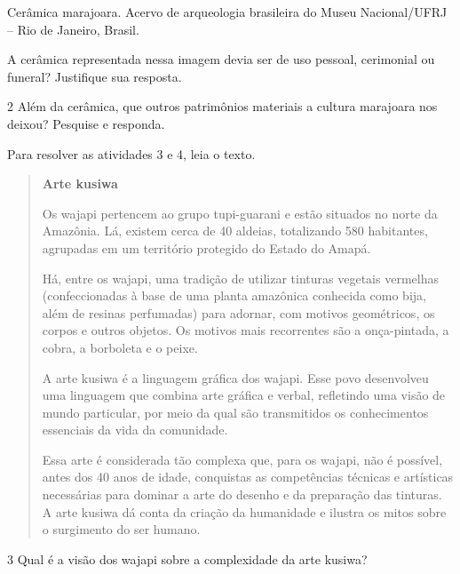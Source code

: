 Cerâmica marajoara. Acervo de arqueologia brasileira do Museu
Nacional/UFRJ -- Rio de Janeiro, Brasil.

A cerâmica representada nessa imagem devia ser de uso pessoal, cerimonial ou funeral? Justifique sua resposta.



\num{2}  Além da cerâmica, que outros patrimônios materiais a cultura marajoara nos deixou? Pesquise e responda.



Para resolver as atividades 3 e 4, leia o texto.

\begin{quote}
\textbf{Arte kusiwa}

Os wajapi pertencem ao grupo tupi-guarani e estão situados no norte da
Amazônia. Lá, existem cerca de 40 aldeias, totalizando 580 habitantes,
agrupadas em um território protegido do Estado do Amapá.

Há, entre os wajapi, uma tradição de utilizar tinturas vegetais vermelhas
(confeccionadas à base de uma planta amazônica conhecida como bija, além
de resinas perfumadas) para adornar, com motivos geométricos, os corpos e
outros objetos. Os motivos mais recorrentes são a onça-pintada, a cobra, a
borboleta e o peixe.

A arte kusiwa é a linguagem gráfica dos wajapi. Esse povo
desenvolveu uma linguagem que combina arte gráfica e verbal, refletindo uma
visão de mundo particular, por meio da qual são transmitidos os conhecimentos
essenciais da vida da comunidade.

Essa arte é considerada tão complexa que, para os wajapi, não é possível, antes
dos 40 anos de idade, conquistas as competências técnicas e artísticas necessárias
para dominar a arte do desenho e da preparação das tinturas. A arte kusiwa dá conta
da criação da humanidade e ilustra os mitos sobre o surgimento do ser humano.

\end{quote}


\num{3}  Qual é a visão dos wajapi sobre a complexidade da arte kusiwa?

